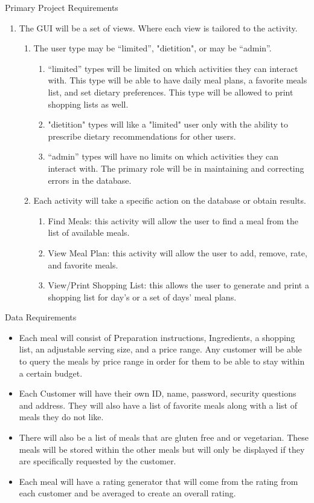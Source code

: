 \documentclass[a4paper,10pt,toc=graduated]{article}
\begin{document}
\begin{mySubsection}{Primary Project Requirements}
\begin{enumerate}
\begin{enumerate}
\item
The GUI will be a set of views. Where each view is tailored to the activity.
\begin{enumerate}
\item
The user type may be “limited”, "dietition", or may be “admin”.
\begin{enumerate}
\item
“limited” types will be limited on which activities they can interact with.
This type will be able to have daily meal plans, a favorite meals list,
and set dietary preferences.
This type will be allowed to print shopping lists as well.
\item
"dietition" types will like a "limited" user
only with the ability to prescribe dietary recommendations for other users.
\item
“admin” types will have no limits on which activities they can interact with.
The primary role will be in maintaining and correcting errors in the database.
\end{enumerate}
\item
Each activity will take a specific action on the database or obtain results.
\begin{enumerate}
\item
Find Meals: this activity will allow the user to find a meal from the list of available meals.
\item
View Meal Plan: this activity will allow the user to add, remove, rate, and favorite meals.
\item
View/Print Shopping List: this allows the user to generate and print a shopping list for day’s or a set of days’ meal plans.
\end{enumerate}
\end{enumerate}
\end{enumerate}
\end{enumerate}
\end{mySubsection}
\begin{mySubsection}{Data Requirements}
\begin{itemize}
\item
Each meal will consist of Preparation instructions, Ingredients, a shopping list, an adjustable serving size, and a price range. Any customer will be able to query the meals by price range in order for them to be able to stay within a certain budget.
\item
Each Customer will have their own ID, name, password, security questions and address. They will also have a list of favorite meals along with a list of meals they do not like.
\item
There will also be a list of meals that are gluten free and or vegetarian. These meals will be stored within the other meals but will only be displayed if they are specifically requested by the customer.
\item
Each meal will have a rating generator that will come from the rating from each customer and be averaged to create an overall rating.
\end{itemize}
\end{mySubsection}
\end{document}
